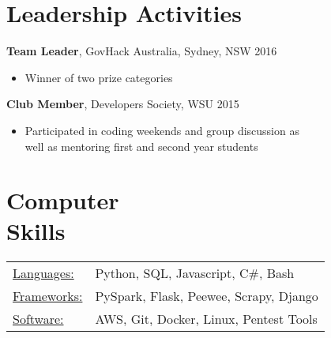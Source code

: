 \documentclass[margin]{res}
\begin{document}
\begin{resume}
\section{Leadership   Activities}
               {\bf Team Leader}, GovHack Australia, Sydney, NSW    \hfill        2016
                \begin{itemize} \itemsep -2pt
              	\item Winner of two prize categories 
		\end{itemize}

		{\bf Club Member}, Developers Society, WSU \hfill   2015
                \begin{itemize} \itemsep -2pt
                 \item Participated in coding weekends and group discussion as \\
			 well as mentoring first and second year students
		 \end{itemize}

\section{Computer \\ Skills}
   \begin{tabular}{l p{3in}}
    \underline{Languages:} & Python, SQL, Javascript, C#, Bash\\
	\underline{Frameworks:} &  PySpark, Flask, Peewee, Scrapy, Django \\
	\underline{Software:} &  AWS, Git, Docker, Linux, Pentest Tools
 \end{tabular}

\end{resume}
\end{document}
